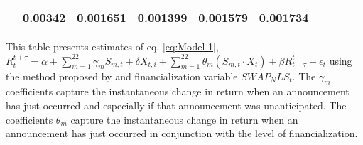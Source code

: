 \begin{sidewaystable}
{\begin{tabular}{@{}lllllllllllll@{}}
                                      & \multicolumn{2}{c}{ 0.00342 }                                                 & \multicolumn{2}{c}{ 0.001651 }                                                 & \multicolumn{2}{c}{ 0.001399 }                                                 & \multicolumn{2}{c}{ 0.001579 }                                                   & \multicolumn{2}{c}{ 0.001734 }                                                 \\ \bottomrule 
\end{tabular}
}
\begin{tablenotes}\item 
    \singlespacing
    \footnotesize
    This table presents estimates of eq. \ref{eq:Model 1}, $R_{t}^{t+\tau}=\alpha+\sum_{m=1}^{22} \gamma_m S_{m,t}+ \delta X_{t,i} + \sum_{m=1}^{22} \theta_m (S_{m,t} \cdot X_t)+\beta R_{t-\tau}^{t}+\epsilon_{t}$ using the method proposed by \citet{kurov2019price} and financialization variable $SWAP_NLS_t$. The $\gamma_m$ coefficients capture the instantaneous change in return when an announcement has just occurred and especially if that announcement was unanticipated. The coefficients $\theta_m$ capture the instantaneous change in return when an announcement has just occurred in conjunction with the level of financialization.
\end{tablenotes}
\end{sidewaystable}

